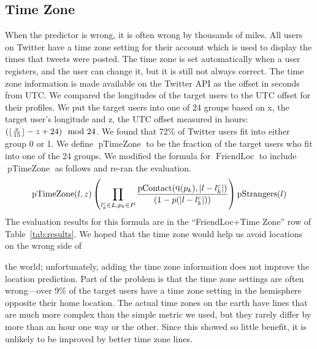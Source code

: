 \documentclass[letterpaper]{article}
\DeclareMathOperator{\pContact}{pContact}
\DeclareMathOperator{\pTimeZone}{pTimeZone}
\DeclareMathOperator{\pStrangers}{pStrangers}
\DeclareMathOperator{\FriendLoc}{FriendLoc}
\DeclareMathOperator{\quantile}{q}
\begin{document}
\ifdefined\THESIS
\subsection{Time Zone}
When the predictor is wrong, it is often wrong by thousands of miles.
%
All users on Twitter have a time zone setting for their account which is used
to display the times that tweets were posted.
%
The time zone is set automatically when a user registers, and the user can
change it, but it is still not always correct.
%
The time zone information is made available on the Twitter API as the offset
in seconds from UTC.
%
We compared the longitudes of the target users to the UTC offset for their
profiles.
%
We put the target users into one of 24 groups based on x, the target user's
longitude and z, the UTC offset measured in hours:
${(\lfloor {x\over15}\rfloor-z+24)\mod{24}}$.
%
We found that 72\% of Twitter users fit into either group 0 or 1.
%
We define $\pTimeZone$ to be the fraction of the target users who fit into one
of the 24 groups.
%
We modified the formula for $\FriendLoc$ to include $\pTimeZone$ as follows and
re-ran the evaluation.
\[
    \pTimeZone(l,z)
    \left(
        \prod_{l^c_k \in L,p_k \in P}
        {\pContact(\quantile(p_k),|l-l^c_k|) \over (1-p(|l-l^c_k|))}
    \right)
    \pStrangers(l)
\]
The evaluation results for this formula are in the ``FriendLoc+Time Zone'' row
of Table~\ref{tab:results}.
%
We hoped that the time zone would help us avoid locations on the wrong side of

the world; unfortunately, adding the time zone information does not improve the
location prediction.
%
Part of the problem is that the time zone settings are often wrong---over 9\% of
the target users have a time zone setting in the hemisphere opposite their home
location.
%
The actual time zones on the earth have lines that are much more complex than
the simple metric we used, but they rarely differ by more than an hour one way
or the other.
%
Since this showed so little benefit, it is unlikely to be improved by better
time zone lines.

\fi

\ifdefined\THESIS
\end{document}
